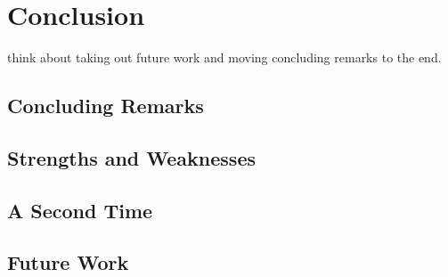 \section{Conclusion}

think about taking out future work and moving concluding remarks to the end.

\subsection{Concluding Remarks}


\subsection{Strengths and Weaknesses}

\subsection{A Second Time}


\subsection{Future Work}
